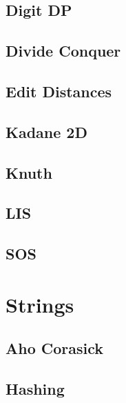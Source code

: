 \subsection{Digit DP}
\raggedbottom
\hrulefill
\subsection{Divide Conquer}
\raggedbottom
\hrulefill
\subsection{Edit Distances}
\raggedbottom
\hrulefill
\subsection{Kadane 2D}
\raggedbottom
\hrulefill
\subsection{Knuth}
\raggedbottom
\hrulefill
\subsection{LIS}
\raggedbottom
\hrulefill
\subsection{SOS}
\raggedbottom
\hrulefill

\section{Strings}
\subsection{Aho Corasick}
\raggedbottom
\hrulefill
\subsection{Hashing}
\raggedbottom
\hrulefill
